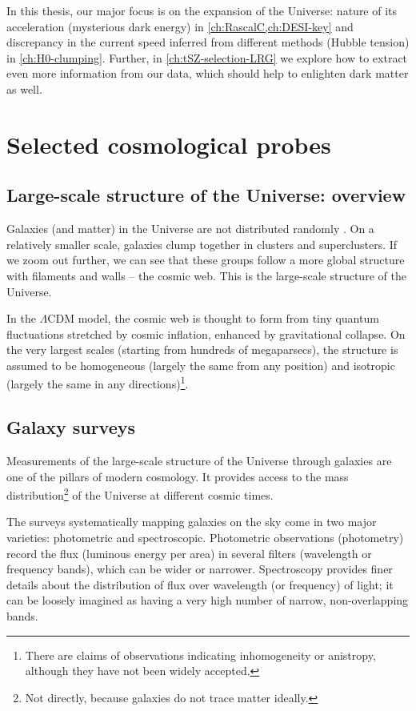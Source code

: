 In this thesis, our major focus is on the expansion of the Universe: nature of its acceleration (mysterious dark energy) in \cref{ch:RascalC,ch:DESI-key} and discrepancy in the current speed inferred from different methods (Hubble tension) in \cref{ch:H0-clumping}.
Further, in \cref{ch:tSZ-selection-LRG} we explore how to extract even more information from our data, which should help to enlighten dark matter as well.

\section{Selected cosmological probes}

\subsection{Large-scale structure of the Universe: overview}

Galaxies (and matter) in the Universe are not distributed randomly \citep[e.g.,][]{distribution-of-galaxies-Shapley1933}.
On a relatively smaller scale, galaxies clump together in clusters and superclusters.
If we zoom out further, we can see that these groups follow a more global structure with filaments and walls -- the cosmic web.
This is the large-scale structure of the Universe.

In the $\Lambda$CDM model, the cosmic web is thought to form from tiny quantum fluctuations stretched by cosmic inflation, enhanced by gravitational collapse.
On the very largest scales (starting from hundreds of megaparsecs), the structure is assumed to be homogeneous (largely the same from any position) and isotropic (largely the same in any directions)\footnote{There are claims of observations indicating inhomogeneity or anistropy, although they have not been widely accepted.}.

\subsection{Galaxy surveys}

Measurements of the large-scale structure of the Universe through galaxies are one of the pillars of modern cosmology.
It provides access to the mass distribution\footnote{Not directly, because galaxies do not trace matter ideally.} of the Universe at different cosmic times.

The surveys systematically mapping galaxies on the sky come in two major varieties: photometric and spectroscopic.
Photometric observations (photometry) record the flux (luminous energy per area) in several filters (wavelength or frequency bands), which can be wider or narrower.
Spectroscopy provides finer details about the distribution of flux over wavelength (or frequency) of light; it can be loosely imagined as having a very high number of narrow, non-overlapping bands.

